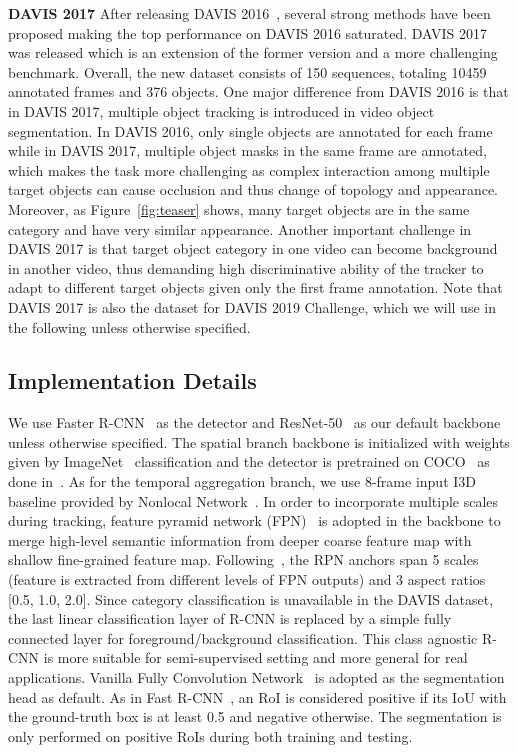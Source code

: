 \documentclass[10pt,twocolumn,letterpaper]{article}
\begin{document}
\textbf{DAVIS 2017}
After releasing DAVIS 2016~\cite{perazzi2016davis}, several strong methods have been proposed making the top performance on DAVIS 2016 saturated.
DAVIS 2017 was released which is an extension of the former version and a more challenging benchmark.
Overall, the new dataset consists of 150 sequences, totaling 10459 annotated frames and 376 objects.
One major difference from DAVIS 2016 is that in DAVIS 2017, multiple object tracking is introduced in video object segmentation.
In DAVIS 2016, only single objects are annotated for each frame while
in DAVIS 2017, multiple object masks in the same frame are annotated,
which makes the task more challenging as complex interaction among multiple target objects can cause occlusion and thus change of topology and appearance.  Moreover, as Figure~\ref{fig:teaser} shows, many target objects are in the same category and have very similar appearance.
Another important challenge in DAVIS 2017 is that  target object category in one video can become background in another video, thus demanding high discriminative ability of the tracker to adapt to different target objects given only the first frame annotation.
Note that DAVIS 2017 is also the dataset for DAVIS 2019 Challenge, which we will use in the following unless otherwise specified.



\subsection{Implementation Details}

We use Faster R-CNN~\cite{ren2015faster} as the detector and ResNet-50~\cite{he2016resnet} as our default backbone unless otherwise specified.
The spatial branch backbone is initialized with weights given by ImageNet~\cite{deng2009imagenet} classification and the detector is pretrained on COCO~\cite{lin2014coco} as done in~\cite{luiten2018premvos}.
As for the temporal aggregation branch, we use 8-frame input I3D baseline provided by Nonlocal Network~\cite{wang2018nonlocal}.
In order to incorporate multiple scales during tracking,
feature pyramid network (FPN)~\cite{lin2017fpn} is adopted in the backbone to merge high-level semantic information from deeper coarse feature map with  shallow fine-grained feature map.
Following~\cite{lin2017fpn}, the RPN anchors span 5 scales (feature is extracted from different levels of FPN outputs) and 3 aspect ratios [0.5, 1.0, 2.0].
Since category classification is unavailable in the DAVIS dataset, the last linear classification layer of R-CNN is replaced by a simple fully connected layer for foreground/background classification.
This class agnostic R-CNN is more suitable for semi-supervised setting and more general for real applications.
Vanilla Fully Convolution Network~\cite{long2015fcn} is adopted as the segmentation head as default.
As in Fast R-CNN~\cite{girshick2015fast}, an RoI is considered positive if its IoU with the ground-truth box is at least 0.5 and negative otherwise.
The segmentation is only performed on positive RoIs during both training and testing.
\end{document}
